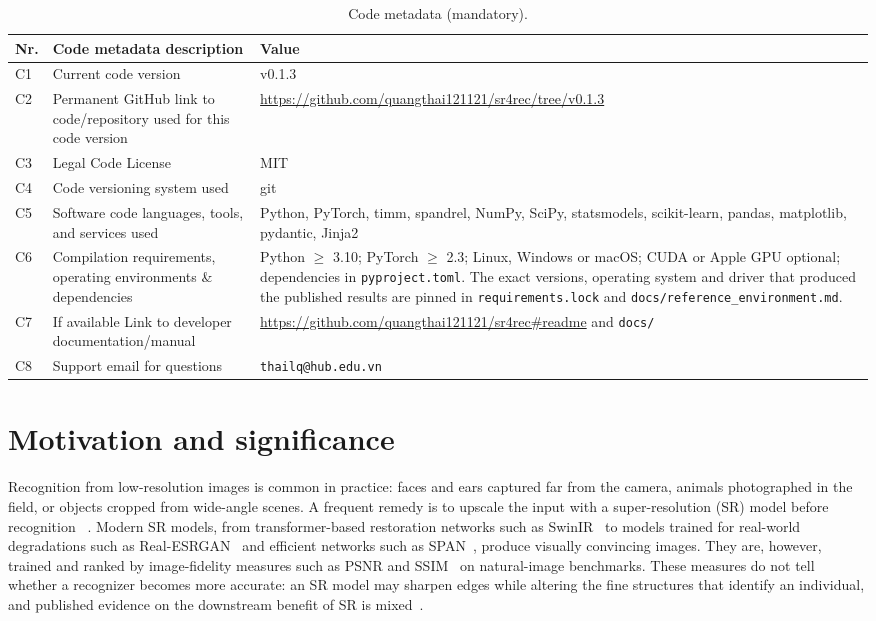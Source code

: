 \documentclass[preprint,12pt]{elsarticle}
\begin{document}
\begin{table}[H]
\centering
\footnotesize
\begin{tabular}{|l|p{5.4cm}|p{6.2cm}|}
\hline
\textbf{Nr.} & \textbf{Code metadata description} & \textbf{Value} \\
\hline
C1 & Current code version & v0.1.3 \\
\hline
C2 & Permanent GitHub link to code/repository used for this code version & \url{https://github.com/quangthai121121/sr4rec/tree/v0.1.3} \\
\hline
C3 & Legal Code License & MIT \\
\hline
C4 & Code versioning system used & git \\
\hline
C5 & Software code languages, tools, and services used & Python, PyTorch, timm, spandrel, NumPy, SciPy, statsmodels, scikit-learn, pandas, matplotlib, pydantic, Jinja2 \\
\hline
C6 & Compilation requirements, operating environments \& dependencies & Python $\geq$ 3.10; PyTorch $\geq$ 2.3; Linux, Windows or macOS; CUDA or Apple GPU optional; dependencies in \texttt{pyproject.toml}. The exact versions, operating system and driver that produced the published results are pinned in \texttt{requirements.lock} and \texttt{docs/reference\_environment.md}. \\
\hline
C7 & If available Link to developer documentation/manual & \url{https://github.com/quangthai121121/sr4rec\#readme} and \texttt{docs/} \\
\hline
C8 & Support email for questions & \texttt{thailq@hub.edu.vn} \\
\hline
\end{tabular}
\caption{Code metadata (mandatory).}
\label{tab:metadata}
\end{table}

\section{Motivation and significance}
\label{sec:motivation}

Recognition from low-resolution images is common in practice: faces and ears captured far from the
camera, animals photographed in the field, or objects cropped from wide-angle scenes. A frequent
remedy is to upscale the input with a super-resolution (SR) model before recognition
~\cite{grm2020csrip,zarachoff2018earsr,markicevic2023earsr}.
Modern SR models, from transformer-based restoration networks such as SwinIR~\cite{liang2021swinir}
to models trained for real-world degradations such as Real-ESRGAN~\cite{wang2021realesrgan} and
efficient networks such as SPAN~\cite{wan2024span}, produce visually convincing images. They are,
however, trained and ranked by image-fidelity measures such as PSNR and SSIM~\cite{wang2004ssim} on
natural-image benchmarks. These measures do not tell whether a recognizer becomes more accurate:
an SR model may sharpen edges while altering the fine structures that identify an individual, and
published evidence on the downstream benefit of SR is mixed~\cite{grm2020csrip,markicevic2023earsr,fookes2012srfr}.
\end{document}
